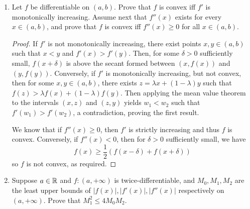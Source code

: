 \begin{enumerate}[1.]
\begin{enumerate}[(a)]
\begin{proof}
                From the above formulation of $f'$, the derivative is continuous at $0$ iff $a-c-1 > 0$, so $a > 1 + c$ as required.
            \end{proof}
        \item $f''(0)$ exists iff $a > 2 + c$.
            \begin{proof}
                We have
                \[
                    f''(0) = \lim_{h \to 0} [ ah^{a-2} \sin(h^{-c}) - ch^{a-c-2} \cos(h^{-c}) ]
                \]
                which exists iff $a - c - 2 > 0$, so $a > 2 + c$.
            \end{proof}
        \item $f''$ is bounded iff $a \ge 2 + 2c$.
            \begin{proof}
                Bash the product rule and find the largest term.
            \end{proof}
        \item $f''$ is continuous iff $a > 2 + 2c$.
            \begin{proof}
                See above.
            \end{proof}
    \end{enumerate}

\item %
    Let $f$ be differentiable on $(a, b)$. Prove that $f$ is convex iff $f'$ is monotonically increasing. Assume next that $f''(x)$ exists for every $x \in (a, b)$, and prove that $f$ is convex iff $f''(x) \ge 0$ for all $x \in (a, b)$.
    \begin{proof}
        If $f'$ is not monotonically increasing, there exist points $x, y \in (a, b)$ such that $x < y$ and $f'(x) > f'(y)$. Then, for some $\delta > 0$ sufficiently small, $f(x+\delta)$ is above the secant formed between $(x, f(x))$ and $(y, f(y))$. Conversely, if $f'$ is monotonically increasing, but not convex, then for some $x, y \in (a, b)$, there exists $z = \lambda x + (1 - \lambda)y$ such that $f(z) > \lambda f(x) + (1 - \lambda) f(y)$. Then applying the mean value theorem to the intervals $(x, z)$ and $(z, y)$ yields $w_1 < w_2$ such that $f'(w_1) > f'(w_2)$, a contradiction, proving the first result.

        We know that if $f''(x) \ge 0$, then $f'$ is strictly increasing and thus $f$ is convex. Conversely, if $f''(x) < 0$, then for $\delta > 0$ sufficiently small, we have
        \[
            f(x) \ge \frac{1}{2} \left( f(x-\delta) + f(x+\delta) \right)
        \]
        so $f$ is not convex, as required.
    \end{proof}
\item %
    Suppose $a \in \mathbb{R}$ and $f: (a, +\infty)$ is twice-differentiable, and $M_0, M_1, M_2$ are the least upper bounds of $|f(x)|, |f'(x)|, |f''(x)|$ respectively on $(a, +\infty)$. Prove that $M_1^2 \le 4M_0M_2$.


\end{enumerate}
